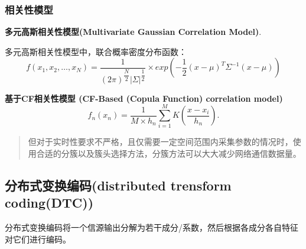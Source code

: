 \subsubsection{相关性模型}
\textbf{多元高斯相关性模型(Multivariate Gaussian Correlation Model)}.

多元高斯相关性模型中，联合概率密度分布函数：
\begin{equation}
    f(x_1,x_2,\dots,x_N) = \dfrac{1}{(2\pi)^{\dfrac{N}{2}}|\Sigma|^{\dfrac{1}{2}}} \times exp\left( -\dfrac{1}{2} (x-\mu)^T \Sigma^{-1}(x-\mu) \right)
    \label{eq1.4}
\end{equation}

\textbf{基于CF相关性模型 (CF-Based (Copula Function) correlation model)}
\begin{equation}
    f_n(x_n) = \dfrac{1}{M \times h_n} \sum_{i=1}^{M}K\left( \dfrac{x-x_i}{h_n} \right).
    \label{eq1.11}
\end{equation}




\begin{quote}
    但对于实时性要求不严格，且仅需要一定空间范围内采集参数的情况时，使用合适的分簇以及簇头选择方法，分簇方法可以大大减少网络通信数据量。
\end{quote}

\subsection{分布式变换编码(distributed trensform coding(DTC))}

分布式变换编码将一个信源输出分解为若干成分/系数，然后根据各成分各自特征对它们进行编码。

